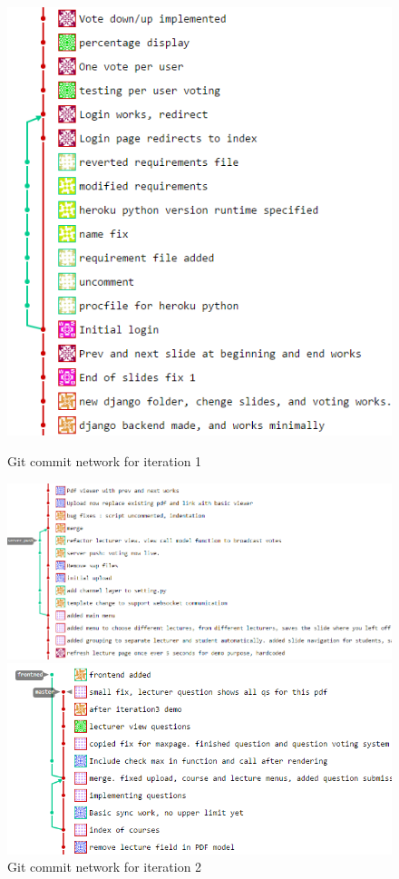\documentclass[11pt]{article}
\begin{document}
\begin{figure}[h]
\begin{minipage}{.5\textwidth}
  \centering
  \includegraphics[width=.6\linewidth]{branch.png}
  \caption{Git commit network for iteration 1}
\end{minipage}%
\begin{minipage}{.5\textwidth}
  \centering
  \includegraphics[width=.9\linewidth]{branch1.png}
  \caption{Git commit network for iteration 2}
\end{minipage}
\begin{minipage}{.5\textwidth}
  \centering
  \includegraphics[width=.9\linewidth]{branch2.png}

\end{minipage}
\end{figure}
\end{document}
